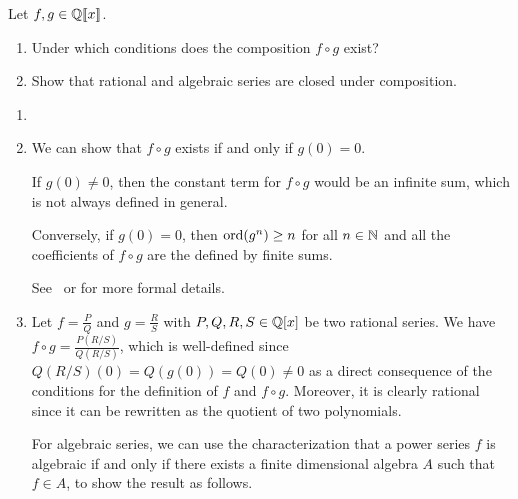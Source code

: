 \begin{exercise}
    Let $f, g \in \mathbb Q[\![x]\!]$.
    \begin{enumerate}
        \item Under which conditions does the composition $f \circ g$ exist?
        \item Show that rational and algebraic series are closed
            under composition.
    \end{enumerate}
\end{exercise}
\begin{solution}
    \begin{enumerate}
        \item[]
        \item We can show that $f \circ g$ exists if and only if $g(0) = 0$.

            If $g(0) \neq 0$, then the constant term for $f \circ g$
            would be an infinite sum, which is not always defined in general.

            Conversely, if $g(0) = 0$, then $\mathrm{ord}(g^n) \geq n$ for
            all $n \in \mathbb N$ and all the coefficients of $f \circ g$
            are the defined by finite sums.

            See~\cite[Section 2.3]{KauersPaule:Tetrahedron:2011} or
            \cite[Section 1.1]{Stanley:EC:CUP:2011} for more formal details.
        \item Let $f = \frac{P}{Q}$ and $g = \frac{R}{S}$ with
            $P,Q,R,S \in \mathbb Q[x]$ be two rational series.
            We have $f \circ g = \frac{P(R/S)}{Q(R/S)}$, which is
            well-defined since $Q(R/S)(0) = Q(g(0)) = Q(0) \neq 0$ as
            a direct consequence of the conditions for the definition
            of $f$ and $f \circ g$.
            Moreover, it is clearly rational since it can be
            rewritten as the quotient of two polynomials.

            For algebraic series, we can use the characterization
            that a power series $f$ is algebraic if and only if there
            exists a finite dimensional algebra $A$ such that $f \in
            A$, to show the result as follows.


\end{enumerate}
\end{solution}
